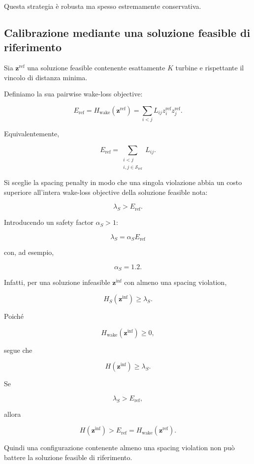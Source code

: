 \documentclass[11pt,a4paper]{report}
\begin{document}
Questa strategia è robusta ma spesso estremamente conservativa.

\subsection{Calibrazione mediante una soluzione feasible di riferimento}

Sia $\mathbf z^{\mathrm{ref}}$ una soluzione feasible contenente
esattamente $K$ turbine e rispettante il vincolo di distanza minima.

Definiamo la sua pairwise wake-loss objective:

\[
E_{\mathrm{ref}}
=
H_{\mathrm{wake}}(\mathbf z^{\mathrm{ref}})
=
\sum_{i<j}
L_{ij}
z_i^{\mathrm{ref}}
z_j^{\mathrm{ref}}.
\]

Equivalentemente,

\[
E_{\mathrm{ref}}
=
\sum_{\substack{
i<j\\
i,j\in\mathcal S_{\mathrm{ref}}
}}
L_{ij}.
\]

Si sceglie la spacing penalty in modo che una singola violazione abbia
un costo superiore all'intera wake-loss objective della soluzione
feasible nota:

\[
\lambda_S
>
E_{\mathrm{ref}}.
\]

Introducendo un safety factor $\alpha_S>1$:

\[
\boxed{
\lambda_S
=
\alpha_S
E_{\mathrm{ref}}
}
\]

con, ad esempio,

\[
\alpha_S=1.2.
\]

Infatti, per una soluzione infeasible $\mathbf z^{\mathrm{inf}}$ con
almeno una spacing violation,

\[
H_S(\mathbf z^{\mathrm{inf}})
\geq
\lambda_S.
\]

Poiché

\[
H_{\mathrm{wake}}(\mathbf z^{\mathrm{inf}})
\geq0,
\]

segue che

\[
H(\mathbf z^{\mathrm{inf}})
\geq
\lambda_S.
\]

Se

\[
\lambda_S
>
E_{\mathrm{ref}},
\]

allora

\[
H(\mathbf z^{\mathrm{inf}})
>
E_{\mathrm{ref}}
=
H_{\mathrm{wake}}(\mathbf z^{\mathrm{ref}}).
\]

Quindi una configurazione contenente almeno una spacing violation non può
battere la soluzione feasible di riferimento.
\end{document}
